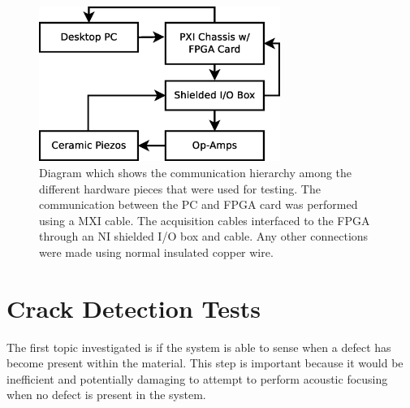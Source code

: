 \begin{figure}[ht!]
\centering
\includegraphics[width=0.7\textwidth]{eps_pics/hardwareComm}
\caption{Diagram which shows the communication hierarchy among the different hardware pieces that were used for testing. The communication between the PC and FPGA card was performed using a MXI cable. The acquisition cables interfaced to the FPGA through an NI shielded I/O box and cable. Any other connections were made using normal insulated copper wire.
	 \label{fig:hardwareComm}} 
\end{figure}

\section{Crack Detection Tests}

The first topic investigated is if the system is able to sense when a defect has become present within the material. This step is important because it would be inefficient and potentially damaging to attempt to perform acoustic focusing when no defect is present in the system.

